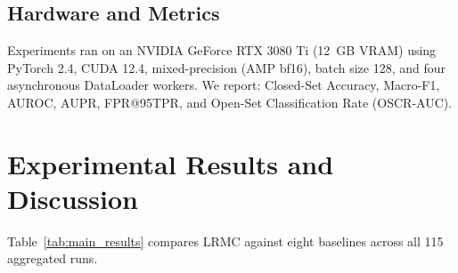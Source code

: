 \documentclass[conference]{IEEEtran}
\begin{document}
\subsection{Hardware and Metrics}
Experiments ran on an NVIDIA GeForce RTX 3080 Ti (12~GB VRAM) using PyTorch 2.4, CUDA 12.4, mixed-precision (AMP bf16), batch size 128, and four asynchronous DataLoader workers. We report: Closed-Set Accuracy, Macro-F1, AUROC, AUPR, FPR@95TPR, and Open-Set Classification Rate (OSCR-AUC).

\section{Experimental Results and Discussion}

Table~\ref{tab:main_results} compares LRMC against eight baselines across all 115 aggregated runs.
\end{document}
